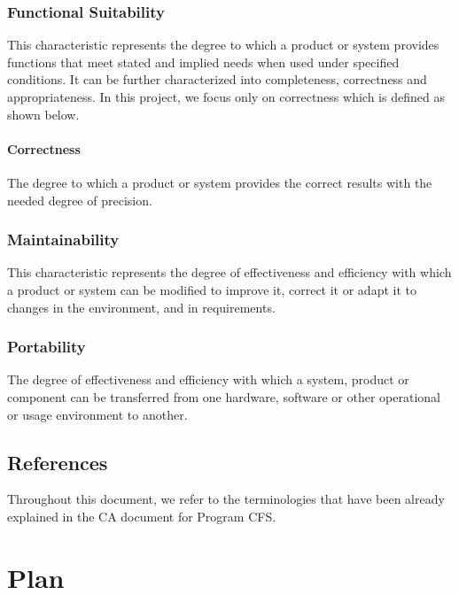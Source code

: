 \documentclass[12pt, titlepage]{article}
\newcommand{\famname}{CFS} %
\begin{document}

\subsubsection {Functional Suitability}

This characteristic represents the degree to which a product or system provides
functions that meet stated and implied needs when used under specified
conditions. It can be further characterized into completeness, correctness and
appropriateness. In this project, we focus only on correctness which is defined
as shown below.

\paragraph{Correctness }   The degree to which a product or
system provides the correct results with the needed degree of precision.

\subsubsection{Maintainability}
This characteristic represents the degree of effectiveness and efficiency with
which a product or system can be modified to improve it, correct it or adapt it
to changes in the environment, and in requirements. 

\subsubsection{Portability}
The degree of effectiveness and efficiency with which a system, product or
component can be transferred from one hardware, software or other operational
or usage environment to another. 


\subsection{References}

Throughout this document, we refer to the terminologies that have been already
explained in the CA document for Program \famname{}. 

\section{Plan}
	
\end{document}
